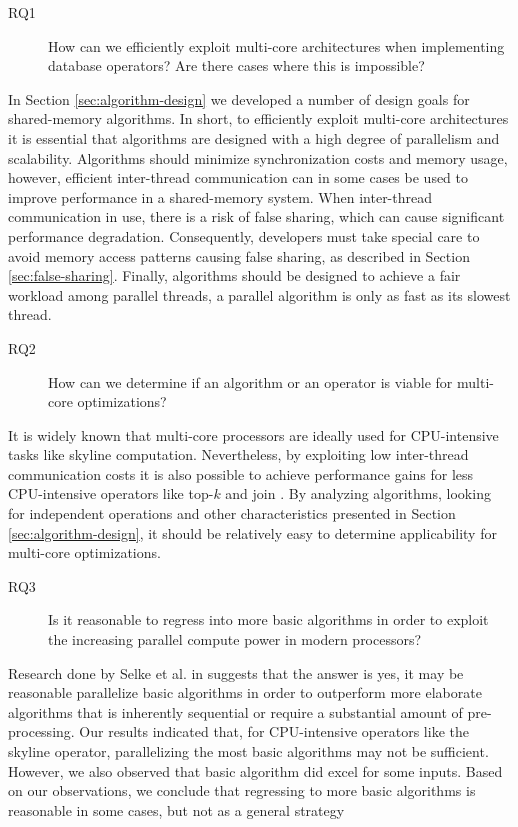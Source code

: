 \documentclass[12pt,a4paper,twoside]{report}
\begin{document}
\begin{description}
	\item[RQ1] How can we efficiently exploit multi-core architectures
	when implementing database operators? Are there cases where this
	is impossible?
\end{description}

In Section \ref{sec:algorithm-design} we developed a number of design
goals for shared-memory algorithms. In short, to efficiently exploit
multi-core architectures it is essential that algorithms are designed
with a high degree of parallelism and scalability. Algorithms should
minimize synchronization costs and memory usage, however, efficient
inter-thread communication can in some cases be used to improve
performance \cite{meneghin2012performance} in a shared-memory system.
When inter-thread communication in use, there is a risk of false
sharing, which can cause significant performance degradation.
Consequently, developers must take special care to avoid memory access
patterns causing false sharing, as described in Section
\ref{sec:false-sharing}. Finally, algorithms should be designed to
achieve a fair workload among parallel threads, a parallel
algorithm is only as fast as its slowest thread.

\begin{description}
	\item[RQ2] How can we determine if an algorithm or an operator is
	viable for multi-core optimizations? 	
\end{description}

It is widely known that multi-core processors are ideally used for
CPU-intensive tasks like skyline computation. Nevertheless, by
exploiting low inter-thread communication costs it is also possible to
achieve performance gains for less CPU-intensive operators like
top-$k$ and join \cite{albutiu2012massively,blanas2011design}. By
analyzing algorithms, looking for independent operations and other
characteristics presented in Section \ref{sec:algorithm-design}, it
should be relatively easy to determine applicability for
multi-core optimizations.

\begin{description}
	\item[RQ3] Is it reasonable to regress into more basic algorithms
	in order to exploit the increasing parallel compute power in
	modern processors?
\end{description}

Research done by Selke et al. in \cite{selke2010highly} suggests that
the answer is yes, it may be reasonable parallelize basic algorithms
in order to outperform more elaborate algorithms that is inherently
sequential or require a substantial amount of pre-processing. Our
results indicated that, for CPU-intensive operators like the skyline
operator, parallelizing the most basic algorithms may not be
sufficient. However, we also observed that basic algorithm did excel
for some inputs. Based on our observations, we conclude that
regressing to more basic algorithms is reasonable in some cases,
but not as a general strategy
\end{document}
